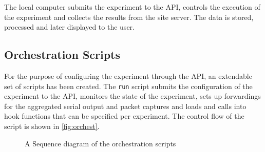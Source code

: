 The local computer submits the experiment to the \ac{API}, controls the execution
of the experiment and collects the results from the site server. The data is
stored, processed and later displayed to the user.

\subsection{Orchestration Scripts}

For the purpose of configuring the experiment through the \ac{API}, an
extendable set of scripts has been created. The \texttt{run} script submits the
configuration of the experiment to the \ac{API}, monitors the state of the
experiment, sets up forwardings for the aggregated serial output and packet
captures and loads and calls into hook functions that can be specified per
experiment. The control flow of the script is shown in \autoref{fig:orchest}.

\begin{figure}[h]
  \centering
  \caption{A Sequence diagram of the orchestration scripts}
  \label{fig:orchest}
\end{figure}

